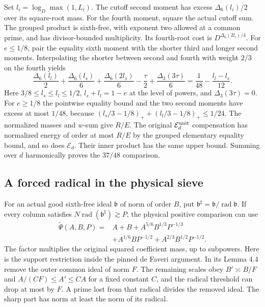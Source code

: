 Set \(l_i=\log_D\max(1,L_i)\). The cutoff second moment has
excess \(\Delta_6(l_i)/2\) over its square-root mass.
For the fourth moment, square the actual cutoff sum.
The grouped product is sixth-free, with exponent two
allowed at a common prime, and has divisor-bounded
multiplicity. Its fourth-root cost is
\(D^{\Delta_6(2l_i)/4}\).
For \(e\le1/8\), pair the equality sixth moment with the
shorter third and longer second moments. Interpolating the
shorter between second and fourth with weight \(2/3\) on
the fourth yields
\[
 \frac{\Delta_6(l_l)}2+\frac{\Delta_6(l_s)}6
   +\frac{\Delta_6(2l_s)}6-\frac{\tau}2
   +\frac{\Delta_3(3\tau)}6
 =\frac1{48}-\frac{l_l-l_s}{12}.
\]
Here \(3/8\le l_s\le l_l\le1/2\), \(l_s+l_l=1-e\) at the level
of powers, and \(\Delta_3(3\tau)=0\).
For \(e\ge1/8\) the pointwise equality bound and the two
second moments have excess at most \(1/48\), because
\((l_s/3-1/8)_++(l_l/3-1/8)_+\le1/24\).
The normalized masses and \(w\)-sum give \(R/E\).
The original \(\mathcal E_d^{\rm unit}\) compensation has
normalized energy of order at most \(R/E\) by the grouped
elementary equality bound, and so does \(\mathcal E_d\).
Their inner product has the same upper bound. Summing over
\(d\) harmonically proves the \(37/48\) comparison.

\subsection{A forced radical in the physical sieve}
\label{pca:joint-radical}

For an actual good sixth-free ideal \(\mathfrak b\) of norm
of order \(B\), put
\(\mathfrak b^\sharp=\mathfrak b/\operatorname{rad}\mathfrak b\).
If every column satisfies \(N\operatorname{rad}(\mathfrak b^\sharp)
\gtrsim P\), the physical positive comparison can use
\begin{equation}\label{pca:joint-psi}
 \begin{aligned}
 \widetilde\Psi(A,B,P)={}&A+B+A^{5/6}B^{1/3}P^{-1/3}\\
              &+A^{1/6}BP^{-1/2}+A^{2/3}B^{1/2}P^{-1/2}.
 \end{aligned}
\end{equation}
The factor multiplies the original squared coefficient mass,
up to subpowers. Here is the support restriction inside
the pinned de Faveri argument. In its Lemma 4.4 remove the
outer common ideal of norm \(F\). The remaining scales obey
\(B'\asymp B/F\) and \(A/(CF)\le A'\le CA\) for a fixed constant
\(C\), and the radical threshold can drop at most by \(F\).
A prime lost from that radical divides the removed ideal.
The sharp part has norm at least the norm of its radical.

